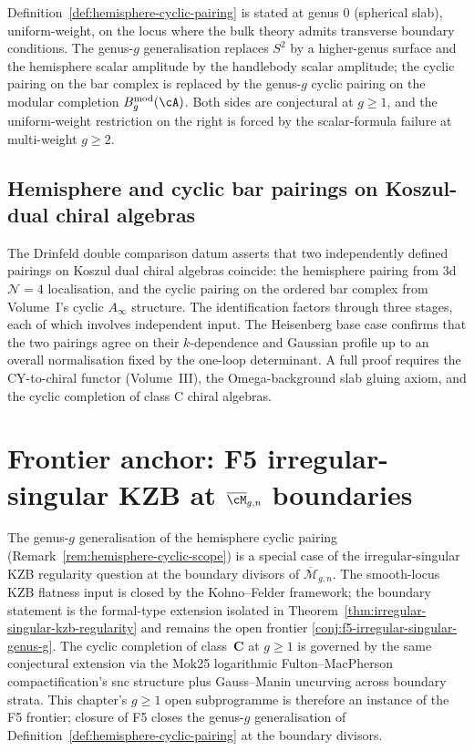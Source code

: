 \begin{remark}[Scope]
\label{rem:hemisphere-cyclic-scope}
Definition~\ref{def:hemisphere-cyclic-pairing} is stated at
genus $0$ (spherical slab), uniform-weight, on the locus
where the bulk theory admits transverse boundary conditions.
The genus-$g$ generalisation replaces $S^2$ by a higher-genus
surface and the hemisphere scalar amplitude by the handlebody
scalar amplitude; the cyclic pairing on the bar complex is
replaced by the genus-$g$ cyclic pairing on the modular
completion $B^{\mathrm{mod}}_g(\cA)$. Both sides are
conjectural at $g\ge 1$, and the uniform-weight restriction on
the right is forced by the scalar-formula failure at multi-weight
$g\ge 2$.
\end{remark}

\subsection{Hemisphere and cyclic bar pairings on Koszul-dual chiral algebras}
\label{subsec:hemisphere-cyclic-summary}

The Drinfeld double comparison datum asserts that two independently
defined pairings on Koszul dual chiral algebras coincide: the
hemisphere pairing from $3$d $\mathcal N=4$ localisation, and
the cyclic pairing on the ordered bar complex from Volume~I's
cyclic $A_\infty$ structure. The identification factors
through three stages, each of which involves independent input.
The Heisenberg base case confirms that the two pairings agree
on their $k$-dependence and Gaussian profile up to an overall
normalisation fixed by the one-loop determinant. A full proof
requires the CY-to-chiral functor (Volume~III), the
Omega-background slab gluing axiom, and the cyclic completion
of class C chiral algebras.

\section{Frontier anchor: F5 irregular-singular KZB at $\overline{\cM}_{g,n}$ boundaries}
\label{sec:modular-pva-frontier-anchor-f5}

The genus-$g$ generalisation of the hemisphere cyclic pairing
(Remark~\ref{rem:hemisphere-cyclic-scope}) is a special case of
the irregular-singular KZB regularity question at the boundary
divisors of $\overline{\mathcal{M}}_{g, n}$. The smooth-locus
KZB flatness input is closed by the Kohno--Felder framework; the
boundary statement is the formal-type extension isolated in
Theorem~\ref{thm:irregular-singular-kzb-regularity} and remains
the open frontier
\cref{conj:f5-irregular-singular-genus-g}. The cyclic completion
of class~$\mathbf{C}$ at
$g \ge 1$ is governed by the same conjectural extension via the
Mok25 logarithmic Fulton--MacPherson compactification's snc
structure plus Gauss--Manin uncurving across boundary strata.
This chapter's $g \ge 1$ open subprogramme is therefore an
instance of the F5 frontier; closure of F5 closes the
genus-$g$ generalisation of
Definition~\ref{def:hemisphere-cyclic-pairing} at the
boundary divisors.

